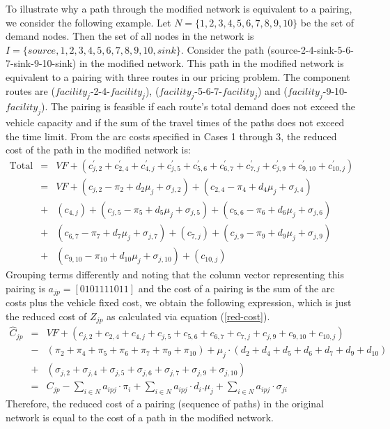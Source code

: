 To illustrate why a path through the modified network is equivalent to a pairing, we consider
the following example. Let $N=\{1,2,3,4,5,6,7,8,9,10\}$ be the set of demand nodes.  Then the 
set of all nodes in the network is $I=\{source,1,2,3,4,5,6,7,8,9,10,sink\}$. Consider the path
(source-2-4-sink-5-6-7-sink-9-10-sink) in the modified network. This path in the modified network
is equivalent to a pairing with three routes in our pricing problem. The component routes are 
($facility_j$-2-4-$facility_j$), ($facility_j$-5-6-7-$facility_j$) and ($facility_j$-9-10-$facility_j$). 
The pairing is feasible if each route's total demand does not exceed the vehicle capacity and if the 
sum of the travel times of the paths does not exceed the time limit. From the arc costs  specified 
in Cases 1 through 3, the reduced cost of the path in the modified network is:
\begin{eqnarray*}
\mbox{Total cost of the path} &=& VF+(c^{'}_{j,2}+c^{'}_{2,4}+c^{'}_{4,j}+c^{'}_{j,5}+c^{'}_{5,6}+c^{'}_{6,7}+ c^{'}_{7,j}+c^{'}_{j,9}+c^{'}_{9,10}+c^{'}_{10,j})\\
                              &= &VF+(c_{j,2}-\pi_2+d_2\mu_j+\sigma_{j,2})+(c_{2,4}-\pi_4+d_4\mu_j+\sigma_{j,4}) \\
                              &+ &(c_{4,j})+(c_{j,5}-\pi_5+d_5\mu_j+\sigma_{j,5})+(c_{5,6}-\pi_6+d_6\mu_j+\sigma_{j,6})\\
                              &+ &(c_{6,7}-\pi_7+d_7\mu_j+\sigma_{j,7})+(c_{7,j})+(c_{j,9}-\pi_9+d_9\mu_j+\sigma_{j,9})\\
                              &+ &(c_{9,10}-\pi_{10}+d_{10}\mu_j+\sigma_{j,10})+(c_{10,j})
\end{eqnarray*} 
Grouping terms differently and noting that the column vector representing this pairing is 
$a_{jp}=[0 1 0 1 1 1 1 0 1 1]$ and the cost of a pairing is the sum of the arc costs plus the vehicle 
fixed cost, we obtain the following expression, which is just the reduced cost of $Z_{jp}$ as calculated
via equation (\ref{red-cost}).
\begin{eqnarray*}
\hat{C}_{jp} &=& VF + (c_{j,2}+c_{2,4}+c_{4,j}+c_{j,5}+c_{5,6}+c_{6,7}+ c_{7,j}+c_{j,9}+c_{9,10}+c_{10,j})\\
             &-& (\pi_2+\pi_4+\pi_5+\pi_6+\pi_7+\pi_9+\pi_{10})+\mu_j \cdot (d_2+d_4+d_5+d_6+d_7+d_9+d_{10})\\
             &+& (\sigma_{j,2}+\sigma_{j,4}+\sigma_{j,5}+\sigma_{j,6}+\sigma_{j,7}+\sigma_{j,9}+\sigma_{j,10})\\
             &=& C_{jp}-\sum_{i\in N}a_{ipj} \cdot \pi_{i}+\sum_{i \in N}a_{ipj} \cdot d_{i}.\mu_{j}+\sum_{i \in N}a_{ipj} \cdot \sigma_{ji}
\end{eqnarray*} 
Therefore, the reduced cost of a pairing (sequence of paths) in the original network is equal to the cost
of a path in the modified network.


